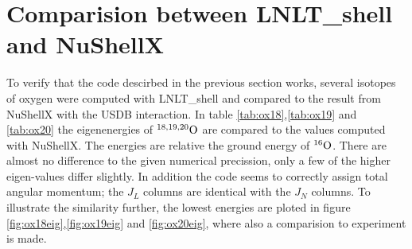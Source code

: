 \section{Comparision between LNLT\_shell and NuShellX}

To verify that the code descirbed in the previous section works, several isotopes of oxygen were computed with LNLT\_shell and compared to the result from NuShellX with the USDB interaction. In table \ref{tab:ox18},\ref{tab:ox19} and \ref{tab:ox20} the eigenenergies of \(^{18,19,20}\rm{O}\) are compared to the values computed with NuShellX. The energies are relative the ground energy of \(^{16}\rm{O}\). There are almost no difference to the given numerical precission, only a few of the higher eigen-values differ slightly. In addition the code seems to correctly assign total angular momentum; the \(J_L\) columns are identical with the \(J_N\) columns. To illustrate the similarity further, the lowest energies are ploted in figure \ref{fig:ox18eig},\ref{fig:ox19eig} and \ref{fig:ox20eig}, where also a comparision to experiment is made.

\onecolumngrid

